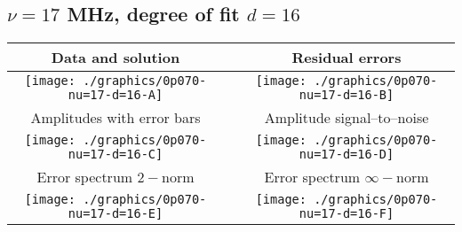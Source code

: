 

% 

\clearpage{}
\break{}

\subsection{$\nu = 17$ MHz, degree of fit $d = 16$}

\begin{table}[h]
    \begin{center}
        \begin{tabular}{ccc}
            Data and solution & \quad & Residual errors \\\hline
            \texttt{[image: ./graphics/0p070-nu=17-d=16-A]} &&
            \texttt{[image: ./graphics/0p070-nu=17-d=16-B]} \\[15pt]
            Amplitudes with error bars && Amplitude signal--to--noise \\\hline
            \texttt{[image: ./graphics/0p070-nu=17-d=16-C]} &&
            \texttt{[image: ./graphics/0p070-nu=17-d=16-D]} \\[15pt]
            Error spectrum $2-$norm && Error spectrum $\infty-$norm \\\hline
            \texttt{[image: ./graphics/0p070-nu=17-d=16-E]} &&
            \texttt{[image: ./graphics/0p070-nu=17-d=16-F]} \\[15pt]
        \end{tabular}
    \end{center}
\label{fig:elev=70, nu=17}
\end{table}



\endinput
